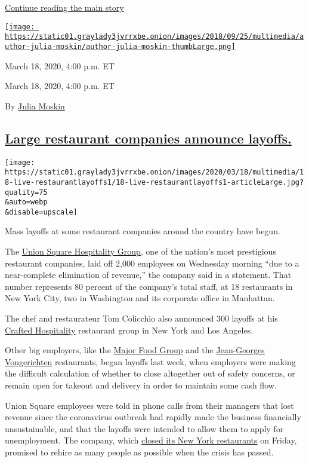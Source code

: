 \protect\hyperlink{after-dfp-ad-mid5}{Continue reading the main story}

\href{https://www.nytimes3xbfgragh.onion/by/julia-moskin}{\texttt{[image: https://static01.graylady3jvrrxbe.onion/images/2018/09/25/multimedia/author-julia-moskin/author-julia-moskin-thumbLarge.png]}}

March 18, 2020, 4:00 p.m. ET

March 18, 2020, 4:00 p.m. ET

By \href{https://www.nytimes3xbfgragh.onion/by/julia-moskin}{Julia
Moskin}

\hypertarget{large-restaurant-companies-announce-layoffs}{%
\subsection{\texorpdfstring{\protect\hyperlink{large-restaurant-companies-announce-layoffs}{Large
restaurant companies announce
layoffs.}}{Large restaurant companies announce layoffs.}}\label{large-restaurant-companies-announce-layoffs}}

\texttt{[image: https://static01.graylady3jvrrxbe.onion/images/2020/03/18/multimedia/18-live-restaurantlayoffs1/18-live-restaurantlayoffs1-articleLarge.jpg?quality=75\\\&auto=webp\\\&disable=upscale]}

Mass layoffs at some restaurant companies around the country have begun.

The \href{https://www.ushgnyc.com/}{Union Square Hospitality Group}, one
of the nation's most prestigious restaurant companies, laid off 2,000
employees on Wednesday morning ``due to a near-complete elimination of
revenue,'' the company said in a statement. That number represents 80
percent of the company's total staff, at 18 restaurants in New York
City, two in Washington and its corporate office in Manhattan.

The chef and restaurateur Tom Colicchio also announced 300 layoffs at
his \href{https://www.craftedhospitality.com/}{Crafted Hospitality}
restaurant group in New York and Los Angeles.

Other big employers, like the \href{https://www.majorfood.com/}{Major
Food Group} and the \href{https://www.jean-georges.com/}{Jean-Georges
Vongerichten} restaurants, began layoffs last week, when employers were
making the difficult calculation of whether to close altogether out of
safety concerns, or remain open for takeout and delivery in order to
maintain some cash flow.

Union Square employees were told in phone calls from their managers that
lost revenue since the coronavirus outbreak had rapidly made the
business financially unsustainable, and that the layoffs were intended
to allow them to apply for unemployment. The company, which
\href{https://www.nytimes3xbfgragh.onion/2020/03/13/dining/restaurant-closings-coronavirus.html}{closed
its New York restaurants} on Friday, promised to rehire as many people
as possible when the crisis has passed.


